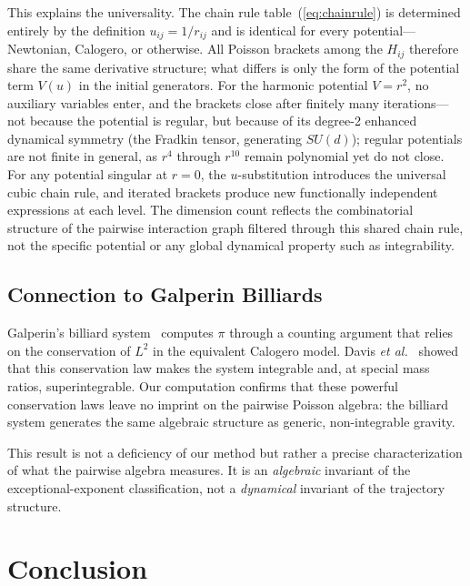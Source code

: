 \documentclass[aps,prl,twocolumn,superscriptaddress,showpacs]{revtex4-2}
\begin{document}
This explains the universality.  The chain rule
table~(\ref{eq:chainrule}) is determined entirely by the definition
$u_{ij} = 1/r_{ij}$ and is identical for every potential---Newtonian,
Calogero, or otherwise.  All Poisson brackets among the $H_{ij}$
therefore share the same derivative structure; what differs is only
the form of the potential term $V(u)$ in the initial generators.
For the harmonic potential $V = r^2$, no auxiliary variables enter,
and the brackets close after finitely many iterations---not because
the potential is regular, but because of its degree-2 enhanced
dynamical symmetry (the Fradkin tensor, generating $SU(d)$); regular
potentials are not finite in general, as $r^4$ through $r^{10}$
remain polynomial yet do not close.  For
any potential singular at $r = 0$, the $u$-substitution introduces
the universal cubic chain rule, and iterated brackets produce new
functionally independent expressions at each level.  The dimension
count reflects the combinatorial structure of the pairwise
interaction graph filtered through this shared chain rule, not the
specific potential or any global dynamical property such as
integrability.

\subsection{Connection to Galperin Billiards}

Galperin's billiard system~\cite{Galperin2003} computes $\pi$ through
a counting argument that relies on the conservation of $L^2$ in the
equivalent Calogero model.  Davis \textit{et al.}~\cite{Davis2017}
showed that this conservation law makes the system integrable and,
at special mass ratios, superintegrable.  Our computation confirms
that these powerful conservation laws leave no imprint on the pairwise
Poisson algebra: the billiard system generates the same algebraic
structure as generic, non-integrable gravity.

This result is not a deficiency of our method but rather a precise
characterization of what the pairwise algebra measures.  It is an
\emph{algebraic} invariant of the exceptional-exponent
classification, not a
\emph{dynamical} invariant of the trajectory structure.


\section{Conclusion}
\label{sec:conclusion}
\end{document}
